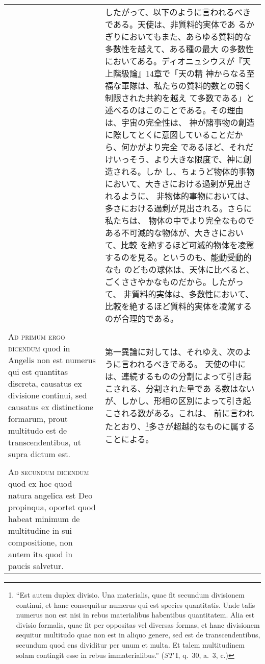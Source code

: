 \documentclass[10pt]{jsarticle} %
\begin{document}
\begin{longtable}{p{21em}p{21em}}
&

 したがって、以下のように言われるべきである。天使は、非質料的実体であ
 るかぎりにおいてもまた、あらゆる質料的な多数性を越えて、ある種の最大
 の多数性においてある。ディオニュシウスが『天上階級論』14章で「天の精
 神からなる至福な軍隊は、私たちの質料的数との弱く制限された共約を越え
 て多数である」と述べるのはこのことである。その理由は、宇宙の完全性は、
 神が諸事物の創造に際してとくに意図していることだから、何かがより完全
 であるほど、それだけいっそう、より大きな限度で、神に創造される。しか
 し、ちょうど物体的事物において、大きさにおける過剰が見出されるように、
 非物体的事物においては、多さにおける過剰が見出される。さらに私たちは、
 物体の中でより完全なものである不可滅的な物体が、大きさにおいて、比較
 を絶するほど可滅的物体を凌駕するのを見る。というのも、能動受動的なも
 のどもの球体は、天体に比べると、ごくささやかなものだから。したがって、
 非質料的実体は、多数性において、比較を絶するほど質料的実体を凌駕する
 のが合理的である。


\\\\


{\scshape Ad primum ergo dicendum} quod in Angelis non
est numerus qui est quantitas discreta, causatus ex divisione continui,
sed causatus ex distinctione formarum, prout multitudo est de
transcendentibus, ut supra dictum est.


&

第一異論に対しては、それゆえ、次のように言われるべきである。
天使の中には、連続するものの分割によって引き起こされる、分割された量であ
 る数はないが、しかし、形相の区別によって引き起こされる数がある。これは、
 前に言われたとおり、\footnote{``Est autem duplex divisio. Una
 materialis, quae fit secundum divisionem continui, et hanc consequitur
 numerus qui est species quantitatis. Unde talis numerus non est nisi in
 rebus materialibus habentibus quantitatem. Alia est divisio formalis,
 quae fit per oppositas vel diversas formas, et hanc divisionem sequitur
 multitudo quae non est in aliquo genere, sed est de transcendentibus,
 secundum quod ens dividitur per unum et multa. Et talem multitudinem
 solam contingit esse in rebus immaterialibus.'' ({\itshape ST} I,
 q.~30, a.~3, c.)}多さが超越的なものに属することによる。

\\\\


{\scshape Ad secundum dicendum} quod ex hoc quod natura
angelica est Deo propinqua, oportet quod habeat minimum de multitudine
in sui compositione, non autem ita quod in paucis salvetur.



\end{longtable}
\end{document}
